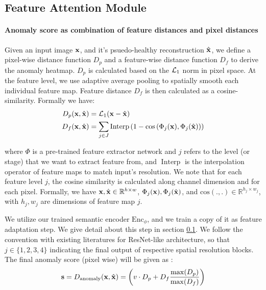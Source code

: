 \subsection{Feature Attention Module}
\label{sec:feature-extractor-network}

\paragraph{Anomaly score as combination of feature distances and pixel distances} Given an input image ${\mathbf{x}}$, and it's psuedo-healthy reconstruction $\hat{{\mathbf{x}}}$, we define a pixel-wise distance function $D_p$ and a feature-wise distance function $D_f$ to derive the anomaly heatmap. $D_p$ is calculated based on the ${\mathcal{L}}_1$ norm in pixel space. At the feature level, we use adaptive average pooling to spatially smooth each individual feature map. Feature distance $D_f$ is then calculated as a cosine-similarity. Formally we have: 
\begin{align}
D_p({\mathbf{x}}, \hat{{\mathbf{x}}}) &= \mathcal{L}_1({\mathbf{x}} - \hat{{\mathbf{x}}}) \\
D_f({\mathbf{x}}, \hat{{\mathbf{x}}}) &= \sum_{j \in J} \operatorname{Interp}\left(1 - \cos\left(\Phi_j({\mathbf{x}}), \Phi_j(\hat{{\mathbf{x}}})\right)\right)
\end{align}

where $\Phi$ is a pre-trained feature extractor network and $j$ refers to the level (or stage) that we want to extract feature from, and $\operatorname{Interp}$ is the interpolation operator of feature maps to match input's resolution. We note that for each feature level $j$, the cosine similarity is calculated along channel dimension and for each pixel. Formally, we have ${\mathbf{x}}, \hat{{\mathbf{x}}} \in \mathbb{R}^{h \times w}$, $\Phi_j({\mathbf{x}}), \Phi_j(\hat{{\mathbf{x}}})$, and $\mathrm{cos}(., .) \in \mathbb{R}^{h_j \times w_j}$, with $h_j, w_j$ are dimensions of feature map $j$. 

We utilize our trained semantic encoder $\mathrm{Enc}_{\phi}$, and we train a copy of it as feature adaptation step. We give detail about this step in section \ref{sec:feature-extractor-network}. We follow the convention with existing literatures for ResNet-like architecture, so that $j \in \{1, 2, 3, 4\}$ indicating the final output of respective spatial resolution blocks. The final anomaly score (pixel wise) will be given as \cite{DDAD}: 
\begin{align}
    {\mathbf{s}} = D_\textnormal{anomaly} ({\mathbf{x}}, \hat{{\mathbf{x}}}) = \left( v \cdot D_p + D_f \frac{\max(D_p)}{\max(D_f)} \right)
\end{align}

